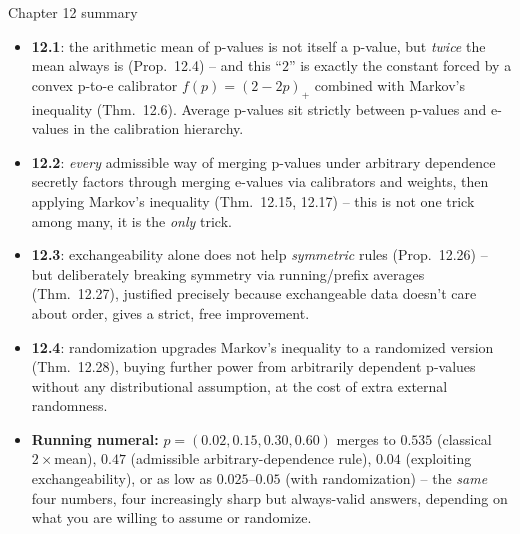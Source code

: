\documentclass[aspectratio=169,10pt]{beamer}
\begin{document}
\begin{frame}{Chapter 12 summary}
  \begin{itemize}
    \item \textbf{12.1}: the arithmetic mean of p-values is not itself a p-value, but \emph{twice} the mean always is (Prop.\ 12.4) -- and this ``$2$'' is exactly the constant forced by a convex p-to-e calibrator $f(p)=(2-2p)_+$ combined with Markov's inequality (Thm.\ 12.6). Average p-values sit strictly between p-values and e-values in the calibration hierarchy.
    \item \textbf{12.2}: \emph{every} admissible way of merging p-values under arbitrary dependence secretly factors through merging e-values via calibrators and weights, then applying Markov's inequality (Thm.\ 12.15, 12.17) -- this is not one trick among many, it is the \emph{only} trick.
    \item \textbf{12.3}: exchangeability alone does not help \emph{symmetric} rules (Prop.\ 12.26) -- but deliberately breaking symmetry via running/prefix averages (Thm.\ 12.27), justified precisely because exchangeable data doesn't care about order, gives a strict, free improvement.
    \item \textbf{12.4}: randomization upgrades Markov's inequality to a randomized version (Thm.\ 12.28), buying further power from arbitrarily dependent p-values without any distributional assumption, at the cost of extra external randomness.
    \item \textbf{Running numeral:} $p=(0.02,0.15,0.30,0.60)$ merges to $0.535$ (classical $2\times$mean), $0.47$ (admissible arbitrary-dependence rule), $0.04$ (exploiting exchangeability), or as low as $0.025$--$0.05$ (with randomization) -- the \emph{same} four numbers, four increasingly sharp but always-valid answers, depending on what you are willing to assume or randomize.
  \end{itemize}
\end{frame}
\end{document}
